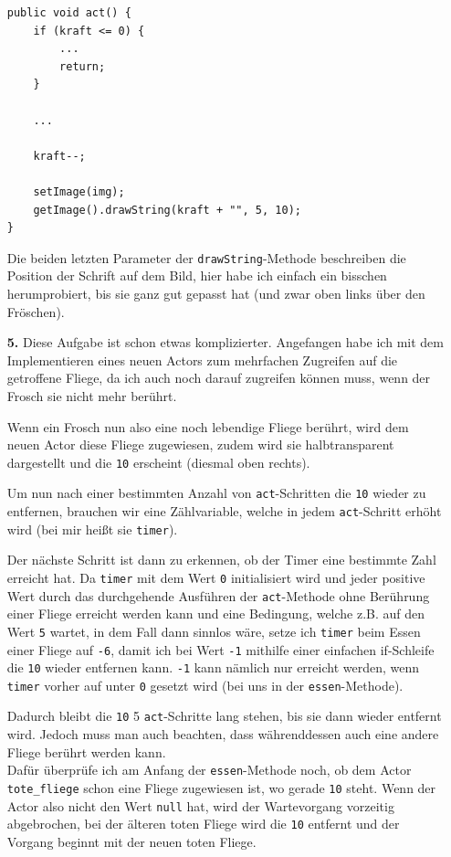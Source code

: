 \documentclass{scrartcl}   %
\begin{document}
\begin{itemize}
\begin{lstlisting}
public void act() {
    if (kraft <= 0) {
        ...
        return;
    }

    ...

    kraft--;
    
    setImage(img);
    getImage().drawString(kraft + "", 5, 10);
}
    \end{lstlisting}
    Die beiden letzten Parameter der \texttt{drawString}-Methode beschreiben die Position der Schrift auf dem Bild, hier habe ich einfach ein bisschen herumprobiert, bis sie ganz gut gepasst hat (und zwar oben links über den Fröschen).
    
    \item[\textbf{5.}] Diese Aufgabe ist schon etwas komplizierter. Angefangen habe ich mit dem Implementieren eines neuen Actors zum mehrfachen Zugreifen auf die getroffene Fliege, da ich auch noch darauf zugreifen können muss, wenn der Frosch sie nicht mehr berührt.
    
    Wenn ein Frosch nun also eine noch lebendige Fliege berührt, wird dem neuen Actor diese Fliege zugewiesen, zudem wird sie halbtransparent dargestellt und die \texttt{10} erscheint (diesmal oben rechts).
    
    Um nun nach einer bestimmten Anzahl von \texttt{act}-Schritten die \texttt{10} wieder zu entfernen, brauchen wir eine Zählvariable, welche in jedem \texttt{act}-Schritt erhöht wird (bei mir heißt sie \texttt{timer}).
    
    Der nächste Schritt ist dann zu erkennen, ob der Timer eine bestimmte Zahl erreicht hat. Da \texttt{timer} mit dem Wert \texttt{0} initialisiert wird und jeder positive Wert durch das durchgehende Ausführen der \texttt{act}-Methode ohne Berührung einer Fliege erreicht werden kann und eine Bedingung, welche z.B. auf den Wert \texttt{5} wartet, in dem Fall dann sinnlos wäre, setze ich \texttt{timer} beim Essen einer Fliege auf \texttt{-6}, damit ich bei Wert \texttt{-1} mithilfe einer einfachen if-Schleife die \texttt{10} wieder entfernen kann. \texttt{-1} kann nämlich nur erreicht werden, wenn \texttt{timer} vorher auf unter \texttt{0} gesetzt wird (bei uns in der \texttt{essen}-Methode).
    
    Dadurch bleibt die \texttt{10} 5 \texttt{act}-Schritte lang stehen, bis sie dann wieder entfernt wird. Jedoch muss man auch beachten, dass währenddessen auch eine andere Fliege berührt werden kann.\\
    Dafür überprüfe ich am Anfang der \texttt{essen}-Methode noch, ob dem Actor \texttt{tote\_fliege} schon eine Fliege zugewiesen ist, wo gerade \texttt{10} steht. Wenn der Actor also nicht den Wert \texttt{null} hat, wird der Wartevorgang vorzeitig abgebrochen, bei der älteren toten Fliege wird die \texttt{10} entfernt und der Vorgang beginnt mit der neuen toten Fliege.\\
    

\end{itemize}
\end{document}
